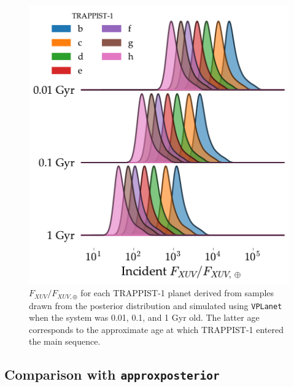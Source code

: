\documentclass[twocolumn]{aastex62}
\newcommand{\vplanet}[0]{\texttt{VPLanet}\xspace}
\newcommand{\approxposterior}[0]{\texttt{approxposterior}\xspace}
\begin{document}
\begin{figure}[]
	\includegraphics[width=\columnwidth]{../Analysis/Fluxes/fluxes.pdf}
   \caption{$F_{XUV}/F_{XUV,\oplus}$ for each TRAPPIST-1 planet derived from samples drawn from the posterior distribution and simulated using \vplanet when the system was 0.01, 0.1, and 1 Gyr old. The latter age corresponds to the approximate age at which TRAPPIST-1 entered the main sequence.}%
    \label{fig:fluxes}%
\end{figure}


\subsection{Comparison with \approxposterior} \label{sec:approx}

\end{document}
